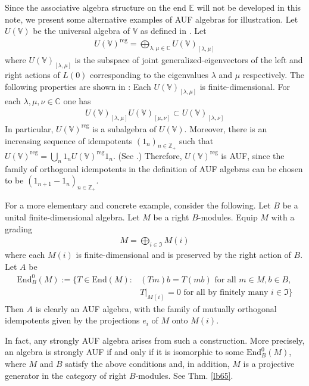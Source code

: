\documentclass[11pt,b5paper,notitlepage]{article}
\theoremstyle{definition}
\theoremstyle{plain}
\newcommand{\fk}{\mathfrak}
\newcommand{\End}{\mathrm{End}} %
\newcommand{\Vbb}{\mathbb V}
\newcommand{\Cbb}{\mathbb C}
\newcommand{\Zbb}{\mathbb Z}
\newcommand{\Ebb}{\mathbb E}
\numberwithin{equation}{section}
\begin{document}
Since the associative algebra structure on the end $\Ebb$ will not be developed in this note, we present some alternative examples of AUF algebras for illustration. Let $U(\Vbb)$ be the universal algebra of $\Vbb$ as defined in \cite{FZ92-universal-alg}. Let
\begin{align*}
U(\Vbb)^{\mathrm{reg}}=\bigoplus_{\lambda,\mu\in\Cbb}U(\Vbb)_{[\lambda,\mu]}
\end{align*}
where $U(\Vbb)_{[\lambda,\mu]}$ is the subspace of joint generalized-eigenvectors of the left and right actions of $L(0)$ corresponding to the eigenvalues $\lambda$ and $\mu$ respectively. The following properties are shown in \cite{MNT10}: Each $U(\Vbb)_{[\lambda,\mu]}$ is finite-dimensional. For each $\lambda,\mu,\nu\in\Cbb$ one has
\begin{align*}
U(\Vbb)_{[\lambda,\mu]}U(\Vbb)_{[\mu,\nu]}\subset U(\Vbb)_{[\lambda,\nu]}
\end{align*}
In particular, $U(\Vbb)^{\mathrm{reg}}$ is a subalgebra of $U(\Vbb)$. Moreover, there is an increasing sequence of idempotents $(1_n)_{n\in\Zbb_+}$ such that $U(\Vbb)^{\mathrm{reg}}=\bigcup_n1_nU(\Vbb)^{\mathrm{reg}}1_n$. (See \cite[Sec. 2.6]{MNT10}.) Therefore, $U(\Vbb)^{\mathrm{reg}}$ is AUF, since the family of orthogonal idempotents in the definition of AUF algebras can be chosen to be $(1_{n+1}-1_n)_{n\in\Zbb_+}$.


For a more elementary and concrete example, consider the following. Let $B$ be a unital finite-dimensional algebra. Let $M$ be a right $B$-modules. Equip $M$ with a grading
\begin{align*}
M=\bigoplus_{i\in\fk I}M(i)
\end{align*}
where each $M(i)$ is finite-dimensional and is preserved by the right action of $B$. Let $A$ be
\begin{align*}
\End^0_B(M):=\{T\in\End(M):&(Tm)b=T(mb)\text{ for all $m\in M,b\in B$,}\\
&T|_{M(i)}=0\text{ for all by finitely many }i\in\fk I \}
\end{align*}
Then $A$ is clearly an AUF algebra, with the family of mutually orthogonal idempotents given by the projections $e_i$ of $M$ onto $M(i)$. 

In fact, any strongly AUF algebra arises from such a construction. More precisely, an algebra is strongly AUF if and only if it is isomorphic to some $\End^0_B(M)$, where $M$ and $B$ satisfy the above conditions and, in addition, $M$ is a projective generator in the category of right $B$-modules. See Thm. \ref{lb65}.
\end{document}
